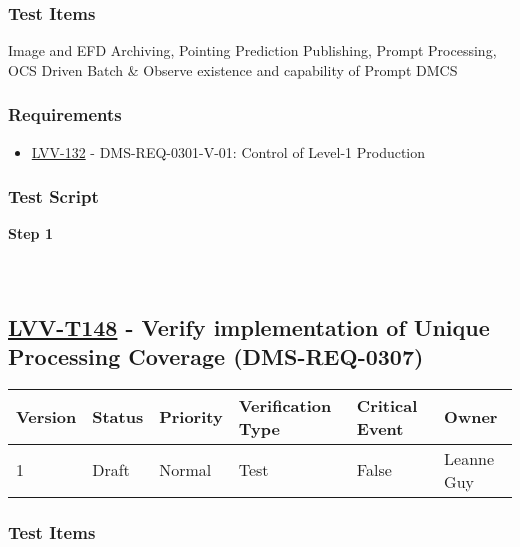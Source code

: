 \hypertarget{test-items-47}{%
\subsubsection{Test Items}\label{test-items-47}}

Image and EFD Archiving, Pointing Prediction Publishing, Prompt
Processing, OCS Driven Batch \& Observe existence and capability of
Prompt DMCS

\hypertarget{requirements-47}{%
\subsubsection{Requirements}\label{requirements-47}}

\begin{itemize}
\tightlist
\item
  \href{https://jira.lsstcorp.org/browse/LVV-132}{LVV-132} -
  DMS-REQ-0301-V-01: Control of Level-1 Production
\end{itemize}

\hypertarget{test-script-47}{%
\subsubsection{Test Script}\label{test-script-47}}

\textbf{Step 1}\\
~\\
~\\

\hypertarget{lvv-t148---verify-implementation-of-unique-processing-coverage-dms-req-0307}{%
\subsection{\texorpdfstring{\href{https://jira.lsstcorp.org/secure/Tests.jspa\#/testCase/LVV-T148}{LVV-T148}
- Verify implementation of Unique Processing Coverage
(DMS-REQ-0307)}{LVV-T148 - Verify implementation of Unique Processing Coverage (DMS-REQ-0307)}}\label{lvv-t148---verify-implementation-of-unique-processing-coverage-dms-req-0307}}

\begin{longtable}[]{@{}llllll@{}}
\toprule
Version & Status & Priority & Verification Type & Critical Event &
Owner\tabularnewline
\midrule
\endhead
1 & Draft & Normal & Test & False & Leanne Guy\tabularnewline
\bottomrule
\end{longtable}

\hypertarget{test-items-48}{%
\subsubsection{Test Items}\label{test-items-48}}


